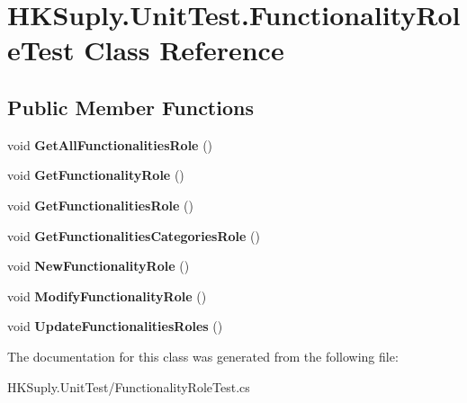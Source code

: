 \hypertarget{class_h_k_suply_1_1_unit_test_1_1_functionality_role_test}{}\section{H\+K\+Suply.\+Unit\+Test.\+Functionality\+Role\+Test Class Reference}
\label{class_h_k_suply_1_1_unit_test_1_1_functionality_role_test}
\subsection*{Public Member Functions}
\begin{DoxyCompactItemize}
\item 
\mbox{\label{class_h_k_suply_1_1_unit_test_1_1_functionality_role_test_ac133f39d498aea4477fca5c33a68fdcc}} 
void {\bfseries Get\+All\+Functionalities\+Role} ()
\item 
\mbox{\label{class_h_k_suply_1_1_unit_test_1_1_functionality_role_test_a6be3df22cff2086d466362562a424849}} 
void {\bfseries Get\+Functionality\+Role} ()
\item 
\mbox{\label{class_h_k_suply_1_1_unit_test_1_1_functionality_role_test_a2939d4000f716e0577656a9526322edb}} 
void {\bfseries Get\+Functionalities\+Role} ()
\item 
\mbox{\label{class_h_k_suply_1_1_unit_test_1_1_functionality_role_test_aa181b9200ffbd3b2a39d7c4eea17d546}} 
void {\bfseries Get\+Functionalities\+Categories\+Role} ()
\item 
\mbox{\label{class_h_k_suply_1_1_unit_test_1_1_functionality_role_test_a044c261bef5cd0575d11799bd86961af}} 
void {\bfseries New\+Functionality\+Role} ()
\item 
\mbox{\label{class_h_k_suply_1_1_unit_test_1_1_functionality_role_test_a7fd10863dba59d604f1bf79382901267}} 
void {\bfseries Modify\+Functionality\+Role} ()
\item 
\mbox{\label{class_h_k_suply_1_1_unit_test_1_1_functionality_role_test_a162e2ece0babea12354c0930f4c77079}} 
void {\bfseries Update\+Functionalities\+Roles} ()
\end{DoxyCompactItemize}


The documentation for this class was generated from the following file\+:\begin{DoxyCompactItemize}
\item 
H\+K\+Suply.\+Unit\+Test/Functionality\+Role\+Test.\+cs\end{DoxyCompactItemize}

